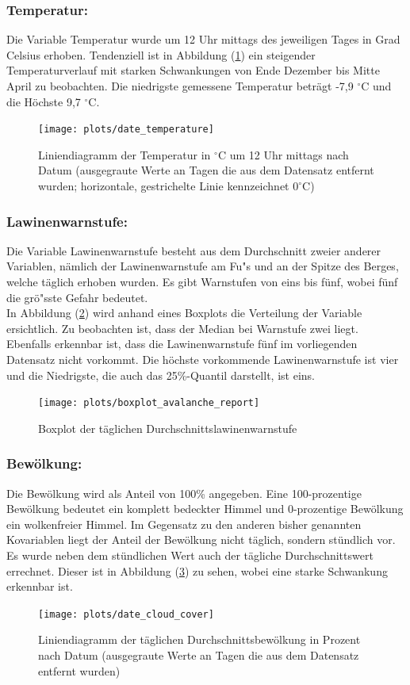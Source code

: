 \documentclass[12pt]{scrreprt}
\begin{document}
\newpage
\subsubsection*{Temperatur:}
Die Variable Temperatur wurde um 12 Uhr mittags des jeweiligen Tages in Grad Celsius erhoben. Tendenziell ist in Abbildung (\ref{pic:date_temperature}) ein steigender Temperaturverlauf mit starken Schwankungen von Ende Dezember bis Mitte April zu beobachten. Die niedrigste gemessene Temperatur beträgt -7,9 $^\circ$C und die Höchste 9,7 $^\circ$C. 
\begin{figure}[H]
	\centering
	\texttt{[image: plots/date\_temperature]}
	\caption{Liniendiagramm der Temperatur in $^\circ$C um 12 Uhr mittags nach Datum (ausgegraute Werte an Tagen die aus dem Datensatz entfernt wurden; horizontale, gestrichelte Linie kennzeichnet $0 ^\circ$C)}
	\label{pic:date_temperature}	
\end{figure}

\newpage
\subsubsection*{Lawinenwarnstufe:}
Die Variable Lawinenwarnstufe besteht aus dem Durchschnitt zweier anderer Variablen, nämlich der Lawinenwarnstufe am Fu"s und an der Spitze des Berges, welche täglich erhoben wurden. Es gibt Warnstufen von eins bis fünf, wobei fünf die grö"sste Gefahr bedeutet. \\
In Abbildung (\ref{pic:boxplot_avalanche_report}) wird anhand eines Boxplots die Verteilung der Variable ersichtlich. Zu beobachten ist, dass der Median bei Warnstufe zwei liegt. Ebenfalls erkennbar ist, dass die Lawinenwarnstufe fünf im vorliegenden Datensatz nicht vorkommt. Die höchste vorkommende Lawinenwarnstufe ist vier und die Niedrigste, die auch das 25\%-Quantil darstellt, ist eins. 
\begin{figure}[H]
	\centering
	\texttt{[image: plots/boxplot\_avalanche\_report]}
	\caption{Boxplot der täglichen Durchschnittslawinenwarnstufe}
	\label{pic:boxplot_avalanche_report}	
\end{figure}

\newpage
\subsubsection*{Bewölkung:}
Die Bewölkung wird als Anteil von 100\% angegeben. Eine 100-prozentige Bewölkung bedeutet ein komplett bedeckter Himmel und 0-prozentige Bewölkung ein wolkenfreier Himmel. Im Gegensatz zu den anderen bisher genannten Kovariablen liegt der Anteil der Bewölkung nicht täglich, sondern stündlich vor. \\
Es wurde neben dem stündlichen Wert auch der tägliche Durchschnittswert errechnet. Dieser ist in Abbildung (\ref{pic:date_cloud_cover}) zu sehen, wobei eine starke Schwankung erkennbar ist.
\begin{figure}[H]
	\centering
	\texttt{[image: plots/date\_cloud\_cover]}
	\caption{Liniendiagramm der täglichen Durchschnittsbewölkung in Prozent nach Datum (ausgegraute Werte an Tagen die aus dem Datensatz entfernt wurden)}
	\label{pic:date_cloud_cover}	
\end{figure}
\end{document}
